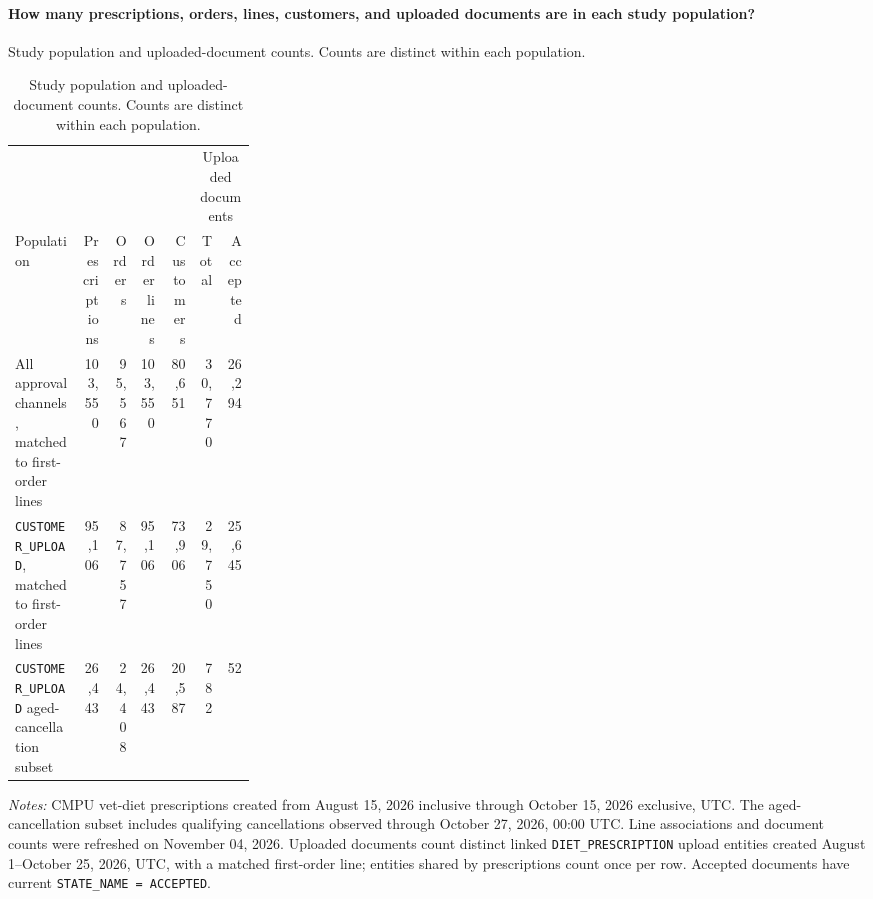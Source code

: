 \paragraph{How many prescriptions, orders, lines, customers, and uploaded documents are in each study population?}
Study population and uploaded-document counts. Counts are distinct within each population.

\begin{table}[htbp]
\centering
\caption{Study population and uploaded-document counts. Counts are distinct within each population.}
\label{tab:study-population-counts}
\small
\begin{tabular}{@{}>{\raggedright\arraybackslash}p{0.28\linewidth}rrrrrr@{}}
\toprule
& & & & & \multicolumn{2}{c}{Uploaded documents} \\
\cmidrule(lr){6-7}
Population & Prescriptions & Orders & \shortstack[r]{Order\\lines} & Customers & Total & Accepted \\
\midrule

All approval channels, matched to first-order lines & 103,550 & 95,567 & 103,550 & 80,651 & 30,770 & 26,294 \\

\texttt{CUSTOMER\_UPLOAD}, matched to first-order lines & 95,106 & 87,757 & 95,106 & 73,906 & 29,750 & 25,645 \\

\texttt{CUSTOMER\_UPLOAD} aged-cancellation subset & 26,443 & 24,408 & 26,443 & 20,587 & 782 & 52 \\
\bottomrule
\end{tabular}

\begin{minipage}{\linewidth}
\footnotesize
\textit{Notes:} CMPU vet-diet prescriptions created from August 15, 2026 inclusive
through October 15, 2026 exclusive, UTC. The aged-cancellation subset includes
qualifying cancellations observed through October 27, 2026, 00:00 UTC.
Line associations and document counts were refreshed on November 04, 2026.
Uploaded documents count distinct linked \texttt{DIET\_PRESCRIPTION} upload entities
created August 1--October 25, 2026, UTC, with a matched first-order line; entities
shared by prescriptions count once per row. Accepted documents have current
\texttt{STATE\_NAME = ACCEPTED}.
\end{minipage}
\end{table}
